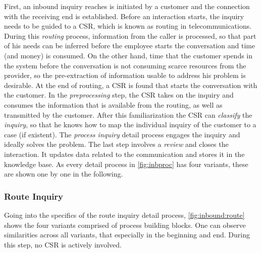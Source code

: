 First, an inbound inquiry reaches is initiated by a customer and the connection with the receiving end is established. Before an interaction starts, the inquiry needs to be guided to a \acrshort{CSR}, which is known as routing in telecommunications. During this \textit{routing} process, information from the caller is processed, so that part of his needs can be inferred before the employee starts the conversation and time (and money) is consumed. On the other hand, time that the customer spends in the system before the conversation is not consuming scarce resources from the provider, so the pre-extraction of information usable to address his problem is desirable. At the end of routing, a \acrshort{CSR} is found that starts the conversation with the customer. In the \textit{preprocessing} step, the \acrshort{CSR} takes on the inquiry and consumes the information that is available from the routing, as well as transmitted by the customer. After this familiarization the \acrshort{CSR} can \textit{classify} the \textit{inquiry}, so that he knows how to map the individual inquiry of the customer to a case (if existent). The \textit{process inquiry} detail process engages the inquiry and ideally solves the problem. The last step involves a \textit{review} and closes the interaction. It updates data related to the communication and stores it in the knowledge base. As every detail process in \Fig \ref{fig:inbproc} has four variants, these are shown one by one in the following. 

\subsubsection{Route Inquiry}

Going into the specifics of the route inquiry detail process, \Fig \ref{fig:inbound:route} shows the four variants comprised of process building blocks. One can observe similarities 
across all variants, that especially in the beginning and end. During this step, no \acrshort{CSR} is actively involved.
\\

